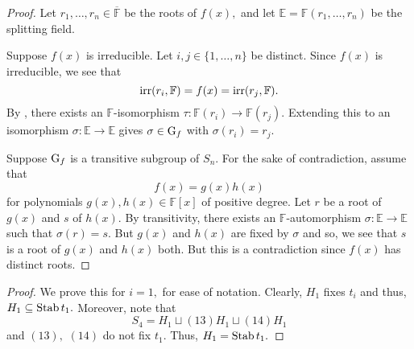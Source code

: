 \transitivegaloisgroupiffirreducible*\label{thm:transitivegaloisgroupiffirreducible2}
\begin{flushright}\hyperref[thm:transitivegaloisgroupiffirreducible]{\upsym}\end{flushright}
\begin{proof}
    Let $r_1, \ldots, r_n \in \overline{\mathbb{F}}$ be the roots of $f(x),$ and let $\mathbb{E} = \mathbb{F}(r_1, \ldots, r_n)$ be the splitting field. 

    \forward Suppose $f(x)$ is irreducible. Let $i, j \in \{1, \ldots, n\}$ be distinct. Since $f(x)$ is irreducible, we see that 
    \begin{equation*} 
        \operatorname{irr}(r_i, \mathbb{F}) = f(x) = \operatorname{irr}(r_j, \mathbb{F}).
    \end{equation*}
    By , there exists an $\mathbb{F}$-isomorphism $\tau : \mathbb{F}(r_i) \to \mathbb{F}(r_j).$ Extending this to an isomorphism $\sigma : \mathbb{E} \to \mathbb{E}$ gives $\sigma \in \operatorname{G}_f$ with $\sigma(r_i) = r_j.$

    \backward Suppose $\operatorname{G}_f$ is a transitive subgroup of $S_n.$ For the sake of contradiction, assume that
    \begin{equation*} 
        f(x) = g(x)h(x)
    \end{equation*}
    for polynomials $g(x), h(x) \in \mathbb{F}[x]$ of positive degree. Let $r$ be a root of $g(x)$ and $s$ of $h(x).$ By transitivity, there exists an $\mathbb{F}$-automorphism $\sigma : \mathbb{E} \to \mathbb{E}$ such that $\sigma(r) = s.$ But $g(x)$ and $h(x)$ are fixed by $\sigma$ and so, we see that $s$ is a root of $g(x)$ and $h(x)$ both. But this is a contradiction since $f(x)$ has distinct roots.
\end{proof}

\stabiliserofti*\label{prop:stabiliserofti2}
\begin{flushright}\hyperref[prop:stabiliserofti]{\upsym}\end{flushright}
\begin{proof}
    We prove this for $i = 1,$ for ease of notation. Clearly, $H_1$ fixes $t_i$ and thus, $H_1 \subseteq \operatorname{Stab} t_1.$ Moreover, note that
    \begin{equation*} 
        S_4 = H_1 \sqcup (13)H_1 \sqcup (14)H_1
    \end{equation*}
    and $(13),$ $(14)$ do not fix $t_1.$ Thus, $H_1 = \operatorname{Stab} t_1.$ 
\end{proof}

